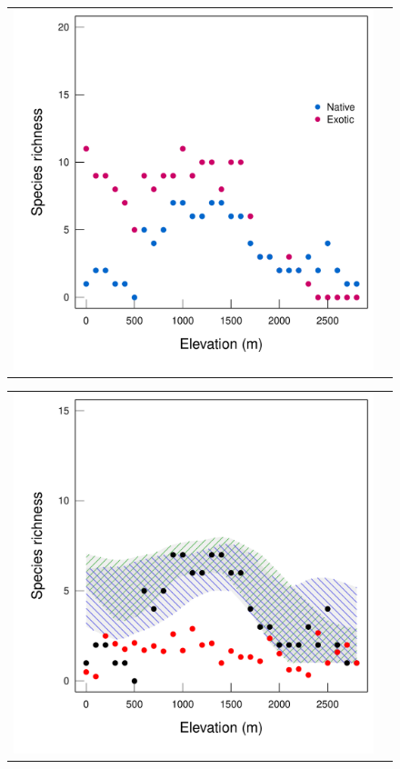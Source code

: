 \documentclass{article}\usepackage[]{graphicx}\usepackage[]{color}
\makeatletter
\newenvironment{kframe}{%
 \def\at@end@of@kframe{}%
 \ifinner\ifhmode%
  \def\at@end@of@kframe{\end{minipage}}%
  \begin{minipage}{\columnwidth}%
 \fi\fi%
 \def\FrameCommand##1{\hskip\@totalleftmargin \hskip-\fboxsep
 \colorbox{shadecolor}{##1}\hskip-\fboxsep
     \hskip-\linewidth \hskip-\@totalleftmargin \hskip\columnwidth}%
 \MakeFramed {\advance\hsize-\width
   \@totalleftmargin\z@ \linewidth\hsize
   \@setminipage}}%
 {\par\unskip\endMakeFramed%
 \at@end@of@kframe}
\newenvironment{knitrout}{}{} %
\makeatother
\begin{document}
{\begin{figure}
\begin{tabular}{cc}
\begin{knitrout}
\begin{kframe}
{\ttfamily\noindent\color{warningcolor}{\#\# Warning in rm(i.back, i.for, lcl, ucl, se, fit): objet 'ucl' introuvable}}

{\ttfamily\noindent\color{warningcolor}{\#\# Warning in rm(i.back, i.for, lcl, ucl, se, fit): objet 'se' introuvable}}

{\ttfamily\noindent\color{warningcolor}{\#\# Warning in rm(i.back, i.for, lcl, ucl, se, fit): objet 'fit' introuvable}}\end{kframe}

{\centering \includegraphics[width=0.5\linewidth]{figures/zoizos-Snatexo-1} 

}



\end{knitrout}
\end{tabular}
\caption{\label{Sgam}}
\end{figure}

\clearpage

\begin{figure}
\hspace{-2cm}
\begin{tabular}{cc}
\begin{knitrout}
\definecolor{shadecolor}{rgb}{0.878, 0.878, 0.878}\color{fgcolor}

{\centering \includegraphics[width=0.5\linewidth]{figures/zoizos-Snatnul-1} 

}
\end{knitrout}
\end{tabular}
\end{figure}}
\end{document}
